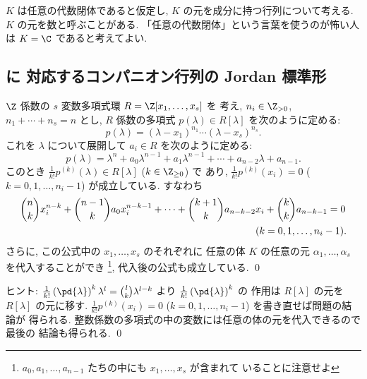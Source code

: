 \documentclass[12pt,twoside]{jarticle}
\begin{document}
$K$ は任意の代数閉体であると仮定し, $K$ の元を成分に持つ行列について考える.
$K$ の元を数と呼ぶことがある. 「任意の代数閉体」という言葉を使うのが怖い人
は $K=\C$ であると考えてよい.


\subsection{ に
  対応するコンパニオン行列の Jordan 標準形}
\label{sec:companion-jordan-(x-a)^n}

\begin{question}
\label{q:generalized-remainder}
  $\Z$ 係数の $s$ 変数多項式環 $R=\Z[x_1,\dots,x_s]$ を
  考え, $n_i\in\Z_{>0}$, $n_1+\cdots+n_s=n$ 
  とし, $R$ 係数の多項式 $p(\lambda)\in R[\lambda]$ を次のように定める:
  \begin{equation*}
    p(\lambda) = (\lambda - x_1)^{n_1}\cdots(\lambda - x_s)^{n_s}.
  \end{equation*}
  これを $\lambda$ について展開して $a_i\in R$ を次のように定める:
  \begin{equation*}
    p(\lambda) 
    = \lambda^n + a_0\lambda^{n-1} + a_1\lambda^{n-1} 
    + \cdots + a_{n-2}\lambda + a_{n-1}.
  \end{equation*}
  このとき $\frac{1}{k!}p^{(k)}(\lambda)\in R[\lambda]$ ($k\in\Z_{\ge0}$) で
  あり, $\frac{1}{k!}p^{(k)}(x_i)=0$ ($k=0,1,\dots,n_i-1$) が成立している.
  すなわち
  \begin{align*}
    &
    \binom{n}{k} x_i^{n-k} 
    + \binom{n-1}{k}a_0 x_i^{n-k-1}
    + \cdots 
    + \binom{k+1}{k}a_{n-k-2} x_i
    + \binom{k}{k}a_{n-k-1}
    = 0
    \\ &
    \hphantom{
    \binom{n}{k} x_i^{n-k} 
    + \binom{n-1}{k}a_0 x_i^{n-k-1}
    + \cdots 
    + \binom{k+1}{k}a_{n-k-2}
    }
    (k=0,1,\dots,n_i-1).
  \end{align*}
  さらに, この公式中の $x_1,\dots,x_s$ のそれぞれに
  任意の体 $K$ の任意の元 $\alpha_1,\dots,\alpha_s$ を代入することができ%
  \footnote{$a_0,a_1,\dots,a_{n-1}$ たちの中にも $x_1,\dots,x_s$ が含まれて
    いることに注意せよ},  %
  代入後の公式も成立している.
  \qed
\end{question}

\noindent
ヒント: $\frac{1}{k!}\left(\pd{\lambda}\right)^k\lambda^l =
\binom{l}{k}\lambda^{l-k}$ より $\frac{1}{k!}\left(\pd{\lambda}\right)^k$ の
作用は $R[\lambda]$ の元を $R[\lambda]$ の元に移す. 
$\frac{1}{k!}p^{(k)}(x_i)=0$ ($k=0,1,\dots,n_i-1$) を書き直せば問題の結論が
得られる.  整数係数の多項式の中の変数には任意の体の元を代入できるので最後の
結論も得られる.
\qed
\end{document}
